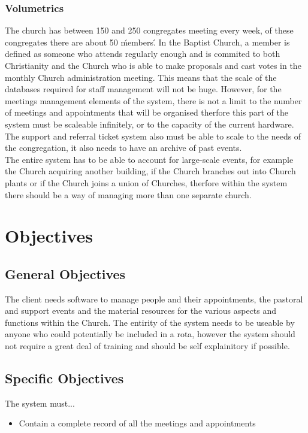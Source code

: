 \subsubsection{Volumetrics}
	The church has between 150 and 250 congregates meeting every week, of these congregates there are about 50 \'members\'. In the Baptist Church, a member is defined as someone who attends regularly enough and is commited to both Christianity and the Church who is able to make proposals and cast votes in the monthly Church administration meeting. This means that the scale of the databases required for staff management will not be huge. However, for the meetings management elements of the system, there is not a limit to the number of meetings and appointments that will be organised therfore this part of the system must be scaleable infinitely, or to the capacity of the current hardware. The support and referral ticket system also must be able to scale to the needs of the congregation, it also needs to have an archive of past events.
	\\
	The entire system has to be able to account for large-scale events, for example the Church acquiring another building, if the Church branches out into Church plants or if the Church joins a union of Churches, therfore within the system there should be a way of managing more than one separate church.


\section{Objectives}

\subsection{General Objectives}
	The client needs software to manage people and their appointments, the pastoral and support events and the material resources for the various aspects and functions within the Church. The entirity of the system needs to be useable by anyone who could potentially be included in a rota, however the system should not require a great deal of training and should be self explainitory if possible.

\subsection{Specific Objectives}
	The system must...
	\begin{itemize}
		\item Contain a complete record of all the meetings and appointments
	\end{itemize}

